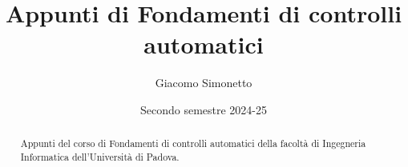 \documentclass[a4paper]{article}
\title{Appunti di Fondamenti di controlli automatici}
\author{Giacomo Simonetto}
\date{Secondo semestre 2024-25}
\begin{document}
\maketitle
\begin{abstract}
	Appunti del corso di Fondamenti di controlli automatici della facoltà di Ingegneria Informatica dell'Università di Padova.
\end{abstract}

\newpage

\tableofcontents

\newpage



\end{document}
